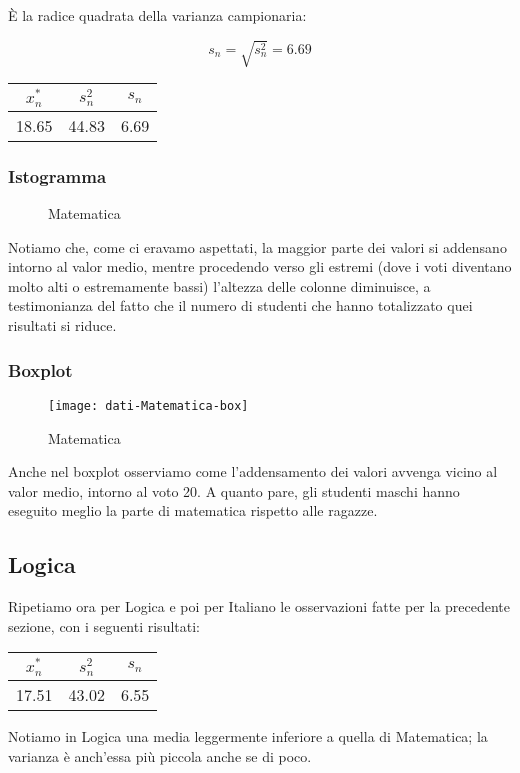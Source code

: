 È la radice quadrata della varianza campionaria:

\[
s_n = \sqrt{s_n^2} = 6.69
\]
\clearpage
\thispagestyle{empty}

\begin{center}
\begin{tabular}{|c|c|c|}
  \hline
  \(x_{n}^{*}\) & \(s_n^2\) & \(s_n\) \\
  \hline
  18.65 & 44.83 & 6.69 \\
  \hline
\end{tabular}
\end{center}

\subsubsection{Istogramma}
\begin{figure}[!h]
  \caption{Matematica}
\end{figure}
Notiamo che, come ci eravamo aspettati, la maggior parte dei valori si addensano intorno al valor medio, mentre procedendo verso gli estremi (dove i voti diventano molto alti o estremamente bassi) l’altezza delle colonne diminuisce, a testimonianza del fatto che il numero di studenti che hanno totalizzato quei risultati si riduce.
\subsubsection{Boxplot}
\begin{figure}[!h]
  \centering
  \texttt{[image: dati-Matematica-box]}
  \caption{Matematica}
\end{figure}
Anche nel boxplot osserviamo come l’addensamento dei valori avvenga vicino al valor medio, intorno al voto 20. A quanto pare, gli studenti maschi hanno eseguito meglio la parte di matematica rispetto alle ragazze.
\restoregeometry
\clearpage

\thispagestyle{empty} %
\subsection{Logica}
Ripetiamo ora per Logica e poi per Italiano le osservazioni fatte per la precedente sezione, con i seguenti risultati:
\begin{center}
\begin{tabular}{|c|c|c|}
  \hline
  \(x_{n}^{*}\) & \(s_n^2\) & \(s_n\) \\
  \hline
  17.51 & 43.02 & 6.55 \\
  \hline
\end{tabular}
\end{center}
Notiamo in Logica una media leggermente inferiore a quella di Matematica; la varianza è anch’essa più piccola anche se di poco.
